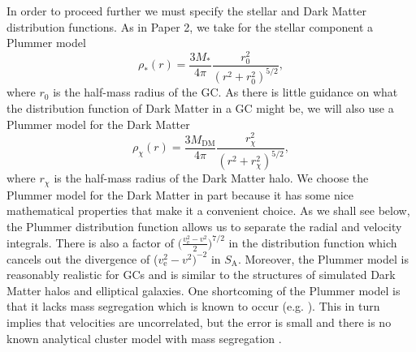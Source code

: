 \documentclass[aps,floatfix,prd,showpacs]{revtex4}
\newcommand{\vesc}{v_{\text{e}}}
\newcommand{\vp}{v^\prime}
\newcommand{\mpr}{m^\prime}
\newcommand{\SA}{S_{\text{A}}}
\newcommand{\rx}{r_\chi}
\newcommand{\MDM}{M_{\mathrm{DM}}}
\begin{document}
In order to proceed further we must specify the stellar and Dark Matter distribution functions. As in Paper 2, we take for the stellar component a Plummer model
%
\begin{equation}
\rho_*(r) = \frac{3M_*}{4\pi}\frac{r_0^2}{(r^2+r_0^2)^{5/2}},
\end{equation}
where $r_0$ is the half-mass radius of the GC. As there is little guidance on what the distribution function of Dark Matter in a GC might be, we will also use a Plummer model for the Dark Matter
%
\begin{equation} 
\rho_\chi(r) = \frac{3\MDM}{4\pi}\frac{\rx^2}{(r^2+\rx^2)^{5/2}},
\end{equation}
%
%
where $\rx$ is the half-mass radius of the Dark Matter halo. We choose the Plummer model for the Dark Matter in part because it has some nice mathematical properties that make it a convenient choice. As we shall see below, the Plummer distribution function allows us to separate the radial and velocity integrals. There is also a factor of $\big(\frac{\vesc^2 - {v}^2}{2}\big)^{7/2}$ in the distribution function which cancels out the divergence of ($\vesc^2 - v^2)^{-2}$ in $\SA$.  Moreover, the Plummer model is reasonably realistic for GCs \cite{HenonB} and is similar to the structures of simulated Dark Matter halos and elliptical galaxies.  One shortcoming of the Plummer model is that it lacks mass segregation which is known to occur (e.g. \cite{Aarseth1966}).  This in turn implies that velocities are uncorrelated, but the error is small and there is no known analytical cluster model with mass segregation \cite{HenonB}.
%
%
\end{document}
